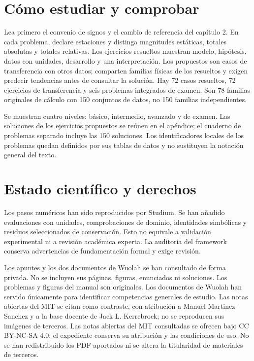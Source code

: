 \documentclass[10pt,openany]{book}
\begin{document}
\section*{Cómo estudiar y comprobar}
Lea primero el convenio de signos y el cambio de referencia del capítulo 2. En cada problema, declare estaciones y distinga magnitudes estáticas, totales absolutas y totales relativas. Los ejercicios resueltos muestran modelo, hipótesis, datos con unidades, desarrollo y una interpretación. Los propuestos son casos de transferencia con otros datos; comparten familias físicas de los resueltos y exigen predecir tendencias antes de consultar la solución. Hay 72 casos resueltos, 72 ejercicios de transferencia y seis problemas integrados de examen. Son 78 familias originales de cálculo con 150 conjuntos de datos, no 150 familias independientes.

Se muestran cuatro niveles: básico, intermedio, avanzado y de examen. Las soluciones de los ejercicios propuestos se reúnen en el apéndice; el cuaderno de problemas separado incluye las 150 soluciones. Los identificadores locales de los problemas quedan definidos por sus tablas de datos y no sustituyen la notación general del texto.

\section*{Estado científico y derechos}
Los pasos numéricos han sido reproducidos por Studium. Se han añadido evaluaciones con unidades, comprobaciones de dominio, identidades simbólicas y residuos seleccionados de conservación. Esto no equivale a validación experimental ni a revisión académica experta. La auditoría del framework conserva advertencias de fundamentación formal y exige revisión.

Los apuntes y los dos documentos de Wuolah se han consultado de forma privada. No se incluyen sus páginas, figuras, enunciados ni soluciones. Los problemas y figuras del manual son originales. Los documentos de Wuolah han servido únicamente para identificar competencias generales de estudio. Las notas abiertas del MIT se citan como contraste, con atribución a Manuel Martinez-Sanchez y a la base docente de Jack L. Kerrebrock; no se reproducen sus imágenes de terceros. Las notas abiertas del MIT consultadas se ofrecen bajo CC BY-NC-SA 4.0; el expediente conserva su atribución y las condiciones de uso. No se han redistribuido los PDF aportados ni se altera la titularidad de materiales de terceros.
\end{document}
